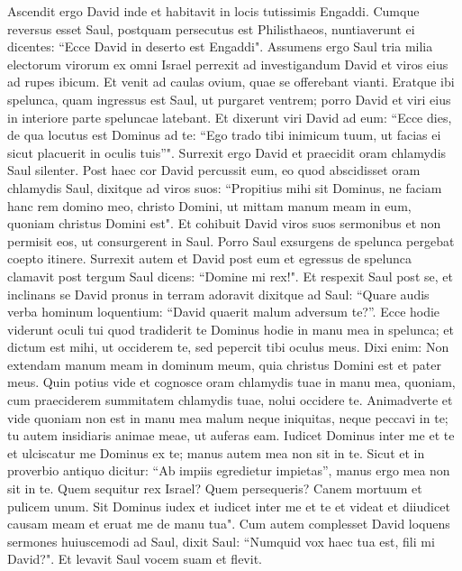 \begin{biblechapter}  
\verse Ascendit ergo David inde et habitavit in locis tutissimis Engaddi. 
\verse Cumque reversus esset Saul, postquam persecutus est Philisthaeos, nuntiaverunt ei dicentes: “Ecce David in deserto est Engaddi". 
\verse Assumens ergo Saul tria milia electorum virorum ex omni Israel perrexit ad investigandum David et viros eius ad rupes ibicum. 
\verse Et venit ad caulas ovium, quae se offerebant vianti. Eratque ibi spelunca, quam ingressus est Saul, ut purgaret ventrem; porro David et viri eius in interiore parte speluncae latebant. 
\verse Et dixerunt viri David ad eum: “Ecce dies, de qua locutus est Dominus ad te: “Ego trado tibi inimicum tuum, ut facias ei sicut placuerit in oculis tuis”". Surrexit ergo David et praecidit oram chlamydis Saul silenter. 
\verse Post haec cor David percussit eum, eo quod abscidisset oram chlamydis Saul, 
\verse dixitque ad viros suos: “Propitius mihi sit Dominus, ne faciam hanc rem domino meo, christo Domini, ut mittam manum meam in eum, quoniam christus Domini est". 
\verse Et cohibuit David viros suos sermonibus et non permisit eos, ut consurgerent in Saul. Porro Saul exsurgens de spelunca pergebat coepto itinere. 
\verse Surrexit autem et David post eum et egressus de spelunca clamavit post tergum Saul dicens: “Domine mi rex!". Et respexit Saul post se, et inclinans se David pronus in terram adoravit 
\verse dixitque ad Saul: “Quare audis verba hominum loquentium: “David quaerit malum adversum te?”. 
\verse Ecce hodie viderunt oculi tui quod tradiderit te Dominus hodie in manu mea in spelunca; et dictum est mihi, ut occiderem te, sed pepercit tibi oculus meus. Dixi enim: Non extendam manum meam in dominum meum, quia christus Domini est 
\verse et pater meus. Quin potius vide et cognosce oram chlamydis tuae in manu mea, quoniam, cum praeciderem summitatem chlamydis tuae, nolui occidere te. Animadverte et vide quoniam non est in manu mea malum neque iniquitas, neque peccavi in te; tu autem insidiaris animae meae, ut auferas eam. 
\verse Iudicet Dominus inter me et te et ulciscatur me Dominus ex te; manus autem mea non sit in te. 
\verse Sicut et in proverbio antiquo dicitur: “Ab impiis egredietur impietas”, manus ergo mea non sit in te. 
\verse Quem sequitur rex Israel? Quem persequeris? Canem mortuum et pulicem unum.  
\verse Sit Dominus iudex et iudicet inter me et te et videat et diiudicet causam meam et eruat me de manu tua". 
\verse Cum autem complesset David loquens sermones huiuscemodi ad Saul, dixit Saul: “Numquid vox haec tua est, fili mi David?". Et levavit Saul vocem suam et flevit. 

\end{biblechapter}
